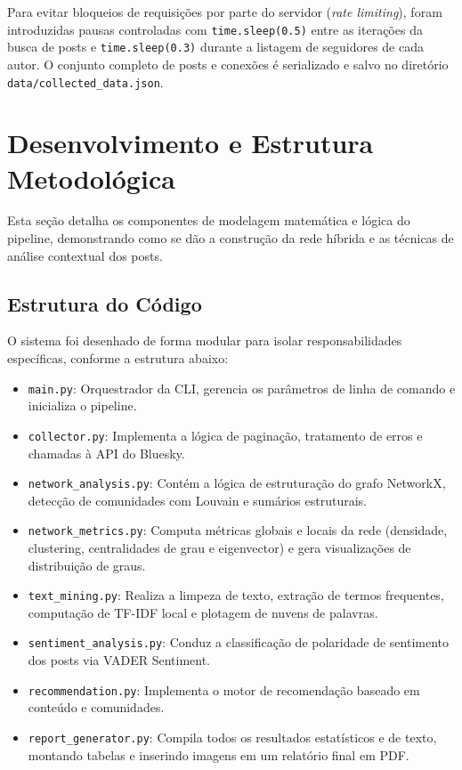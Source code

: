 \documentclass[12pt,a4paper]{article}
\begin{document}
Para evitar bloqueios de requisições por parte do servidor (\textit{rate limiting}), foram introduzidas pausas controladas com \texttt{time.sleep(0.5)} entre as iterações da busca de posts e \texttt{time.sleep(0.3)} durante a listagem de seguidores de cada autor. O conjunto completo de posts e conexões é serializado e salvo no diretório \texttt{data/collected\_data.json}.

\section{Desenvolvimento e Estrutura Metodológica}
Esta seção detalha os componentes de modelagem matemática e lógica do pipeline, demonstrando como se dão a construção da rede híbrida e as técnicas de análise contextual dos posts.

\subsection{Estrutura do Código}
O sistema foi desenhado de forma modular para isolar responsabilidades específicas, conforme a estrutura abaixo:
\begin{itemize}
    \item \texttt{main.py}: Orquestrador da CLI, gerencia os parâmetros de linha de comando e inicializa o pipeline.
    \item \texttt{collector.py}: Implementa a lógica de paginação, tratamento de erros e chamadas à API do Bluesky.
    \item \texttt{network\_analysis.py}: Contém a lógica de estruturação do grafo NetworkX, detecção de comunidades com Louvain e sumários estruturais.
    \item \texttt{network\_metrics.py}: Computa métricas globais e locais da rede (densidade, clustering, centralidades de grau e eigenvector) e gera visualizações de distribuição de graus.
    \item \texttt{text\_mining.py}: Realiza a limpeza de texto, extração de termos frequentes, computação de TF-IDF local e plotagem de nuvens de palavras.
    \item \texttt{sentiment\_analysis.py}: Conduz a classificação de polaridade de sentimento dos posts via VADER Sentiment.
    \item \texttt{recommendation.py}: Implementa o motor de recomendação baseado em conteúdo e comunidades.
    \item \texttt{report_generator.py}: Compila todos os resultados estatísticos e de texto, montando tabelas e inserindo imagens em um relatório final em PDF.
\end{itemize}
\end{document}
